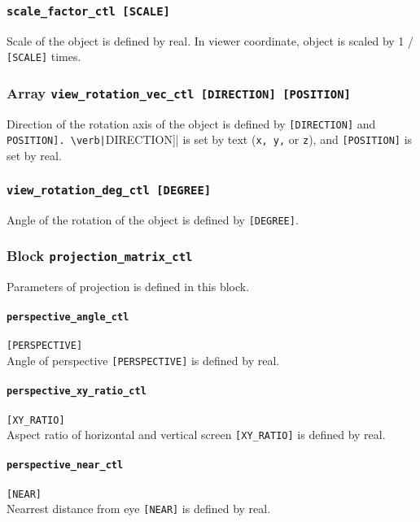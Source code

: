 \subsubsection{\tt scale\_factor\_ctl  [SCALE]}
\label{href_t:scale_factor_ctl}
Scale of the object is defined by real. In viewer coordinate, object is scaled by 1 / \verb|[SCALE]| times.

\subsubsection{Array {\tt view\_rotation\_vec\_ctl [DIRECTION] [POSITION]}}
\label{href_t:view_rotation_vec_ctl}
Direction of the rotation axis of the object is defined by \verb|[DIRECTION]| and \verb[POSITION]. \verb|[DIRECTION]| is set by text (\verb|x, y,| or \verb|z|), and \verb|[POSITION]| is set by real.

\subsubsection{\tt view\_rotation\_deg\_ctl  [DEGREE]}
\label{href_t:view_rotation_deg_ctl}
Angle of the rotation of the object is defined by \verb|[DEGREE]|.

\subsubsection{Block {\tt projection\_matrix\_ctl}}
\label{href_t:projection_matrix_ctl}
Parameters of projection is defined in this block.

\paragraph{\tt perspective\_angle\_ctl}
\label{href_t:perspective_angle_ctl}
\verb|[PERSPECTIVE]| \\
Angle of perspective \verb|[PERSPECTIVE]| is defined by real.

\paragraph{\tt perspective\_xy\_ratio\_ctl}
\label{href_t:perspective_xy_ratio_ctl}
\verb|[XY_RATIO]| \\
Aspect ratio of horizontal and vertical screen \verb|[XY_RATIO]| is defined by real.

\paragraph{\tt perspective\_near\_ctl}
\label{href_t:perspective_near_ctl}
\verb|[NEAR]| \\
Nearrest distance from eye \verb|[NEAR]| is defined by real.

